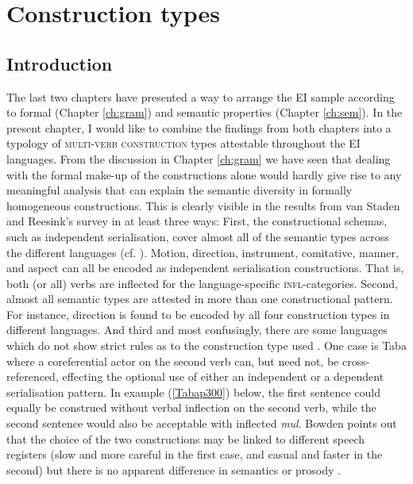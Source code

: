 \chapter{Construction types} \label{ch:constructions}
\section{Introduction}

The last two chapters have presented a way to arrange the EI sample according to formal (Chapter \ref{ch:gram}) and semantic properties (Chapter \ref{ch:sem}). In the present chapter, I would like to combine the findings from both chapters into a typology of \textsc{multi-verb construction} types attestable throughout the EI languages. From the discussion in Chapter \ref{ch:gram} we have seen that dealing with the formal make-up of the constructions alone would hardly give rise to any meaningful analysis that can explain the semantic diversity in formally homogeneous constructions. This is clearly visible in the results from van Staden and Reesink's survey in at least three ways: First, the constructional schemas, such as independent serialisation, cover almost all of the semantic types across the different languages (cf. \citealt[34]{vanstaden2008serial}). Motion, direction, instrument, comitative, manner, and aspect can all be encoded as independent serialisation constructions. That is, both (or all) verbs are inflected for the language-specific \textsc{infl}-categories. Second, almost all semantic types are attested in more than one constructional pattern. For instance, direction is found to be encoded by all four construction types in different languages. And third and most confusingly, there are some languages which do not show strict rules as to the construction type used \citep[24f.]{vanstaden2008serial}. One case is Taba where a coreferential actor on the second verb can, but need not, be cross-referenced, effecting the optional use of either an independent  or a dependent serialisation pattern. In example (\ref{Tabap300}) below, the first sentence could equally be construed without verbal inflection on the second verb, while the second sentence would also be acceptable with inflected \textit{mul}. Bowden points out that the choice of the two constructions may be linked to different speech registers (slow and more careful in the first case, and casual and faster in the second) but there is no apparent difference in semantics or prosody \citep[300]{bowden2001taba}.

